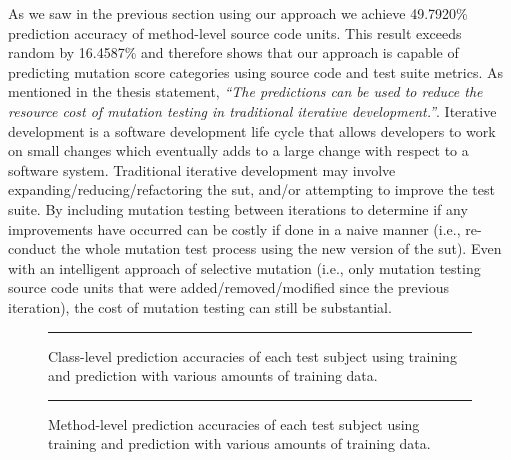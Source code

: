 \noindent
As we saw in the previous section using our approach we achieve 49.7920\% prediction accuracy of method-level source code units. This result exceeds random by 16.4587\% and therefore shows that our approach is capable of predicting mutation score categories using source code and test suite metrics. As mentioned in the thesis statement, \emph{``The predictions can be used to reduce the resource cost of mutation testing in traditional iterative development.''}. Iterative development is a software development life cycle that allows developers to work on small changes which eventually adds to a large change with respect to a software system. Traditional iterative development may involve expanding/reducing/refactoring the \gls{sut}, and/or attempting to improve the test suite. By including mutation testing between iterations to determine if any improvements have occurred can be costly if done in a naive manner (i.e., re-conduct the whole mutation test process using the new version of the \gls{sut}). Even with an intelligent approach of selective mutation (i.e., only mutation testing source code units that were added/removed/modified since the previous iteration), the cost of mutation testing can still be substantial.

\begin{figure}[!tb]
  \centering
  \begin{adjustbox}{max size={.95\textwidth}{.90\textheight}}
    
  \end{adjustbox}
  \caption{Class-level prediction accuracies of each test subject using training and prediction with various amounts of training data.}
  \vspace{2mm}
  \hrule
  \label{fig:divisor_class_graph}
\end{figure}

\begin{figure}[!tb]
  \centering
  \begin{adjustbox}{max size={.95\textwidth}{.90\textheight}}
    
  \end{adjustbox}
  \caption{Method-level prediction accuracies of each test subject using training and prediction with various amounts of training data.}
  \vspace{2mm}
  \hrule
  \label{fig:divisor_method_graph}
\end{figure}

